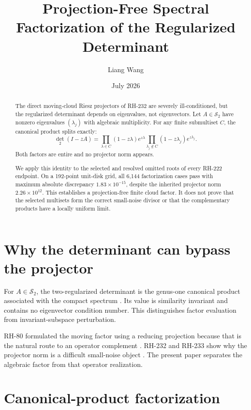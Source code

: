 \documentclass[11pt]{article}
\title{Projection-Free Spectral Factorization of the Regularized Determinant}
\author{Liang Wang}
\date{July 2026}
\theoremstyle{remark}
\newcommand{\Schatten}{\mathcal S}
\begin{document}
\maketitle

\begin{abstract}
The direct moving-cloud Riesz projectors of RH-232 are severely
ill-conditioned, but the regularized determinant depends on eigenvalues, not
eigenvectors.  Let $A\in\Schatten_2$ have nonzero eigenvalues
$(\lambda_j)$ with algebraic multiplicity.  For any finite submultiset $C$,
the canonical product splits exactly:
\[
 \det_2(I-zA)
 =\prod_{\lambda\in C}(1-z\lambda)e^{z\lambda}
  \prod_{\lambda_j\notin C}(1-z\lambda_j)e^{z\lambda_j}.
\]
Both factors are entire and no projector norm appears.

We apply this identity to the selected and resolved omitted roots of every
RH-222 endpoint.  On a 192-point unit-disk grid, all 6,144 factorization
cases pass with maximum absolute discrepancy $1.83\times10^{-15}$, despite
the inherited projector norm $2.26\times10^{12}$.  This establishes a
projection-free finite cloud factor.  It does not prove that the selected
multisets form the correct small-noise divisor or that the complementary
products have a locally uniform limit.
\end{abstract}

\section{Why the determinant can bypass the projector}

For $A\in\Schatten_2$, the two-regularized determinant is the genus-one
canonical product associated with the compact spectrum
\citep{GohbergKrein1969,Simon2005}.  Its value is similarity invariant and
contains no eigenvector condition number.  This distinguishes factor
evaluation from invariant-subspace perturbation.

RH-80 formulated the moving factor using a reducing projection because that
is the natural route to an operator complement \citep{WangRH80}.  RH-232 and
RH-233 show why the projector norm is a difficult small-noise object
\citep{WangRH232,WangRH233}.  The present paper separates the algebraic
factor from that operator realization.

\section{Canonical-product factorization}
\end{document}
